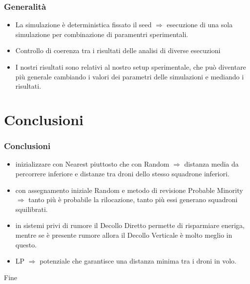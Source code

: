 \documentclass{beamer}
\begin{document}
\begin{frame}
\frametitle{Generalit\`a}
\begin{itemize}
  \item La simulazione \`e deterministica fissato il seed $\Rightarrow$ esecuzione di una sola simulazione per combinazione di paramentri sperimentali.
  \item Controllo di coerenza tra i risultati delle analisi di diverse esecuzioni
  \item  I nostri risultati sono relativi al nostro setup sperimentale, che può diventare pi\`u generale cambiando i valori dei parametri delle simulazioni e mediando i risultati.  
\end{itemize}
\end{frame}

\section{Conclusioni}

\begin{frame}
\frametitle{Conclusioni}
\begin{itemize}
  \item inizializzare con Nearest piuttosto che con Random $\Rightarrow$ distanza media da percorrere inferiore e distanze tra droni dello stesso squadrone inferiori.
  \item con assegnamento iniziale Random e metodo di revisione Probable Minority $\Rightarrow$ 
tanto più è probabile la rilocazione, tanto più essi generano squadroni squilibrati.
    \item  in sistemi privi di rumore il Decollo Diretto permette di risparmiare
eneriga, mentre se è presente rumore allora il Decollo Verticale è molto meglio in questo.
    \item LP $\Rightarrow$ potenziale che garantisce una distanza minima tra i droni in volo.
\end{itemize}
\end{frame}

\begin{frame}
\centering
\Huge
Fine
\end{frame}
\end{document}
